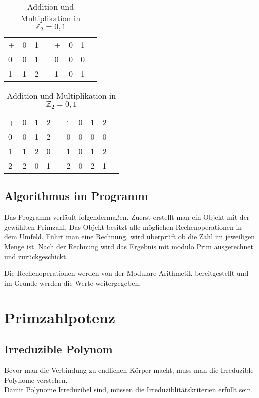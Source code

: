 \begin{table}[h]\caption{Addition und Multiplikation in $ \mathbb{Z}_2 = {0,1} $}
    \begin{tabular}{l|l|lll|l|ll}
    + & 0 & 1 &  & + & 0 & 1 &  \\ \cline{1-3} \cline{5-7}
    0 & 0 & 1 &  & 0 & 0 & 0 &  \\ \cline{1-3} \cline{5-7}
    1 & 1 & 2 &  & 1 & 0 & 1 & 
    \end{tabular}
\end{table}
\begin{table}[h]\caption{Addition und Multiplikation in $ \mathbb{Z}_2 = {0,1} $}
    \begin{tabular}{l|l|l|lll|l|l|ll}
    + & 0 & 1 & 2 &  & $\cdot$ & 0 & 1 & 2 &  \\ \cline{1-4} \cline{6-9}
    0 & 0 & 1 & 2 &  & 0 & 0 & 0 & 0 &  \\ \cline{1-4} \cline{6-9}
    1 & 1 & 2 & 0 &  & 1 & 0 & 1 & 2 &  \\ \cline{1-4} \cline{6-9}
    2 & 2 & 0 & 1 &  & 2 & 0 & 2 & 1 & 
    \end{tabular}
\end{table}

\subsection*{Algorithmus im Programm}

Das Programm verläuft folgendermaßen. Zuerst erstellt man ein Objekt mit der gewählten Primzahl. Das Objekt besitzt alle möglichen Rechenoperationen in dem Umfeld.
Führt man eine Rechnung, wird überprüft ob die Zahl im jeweiligen Menge ist. Nach der Rechnung wird das Ergebnis mit modulo Prim ausgerechnet und zurückgeschickt. 

Die Rechenoperationen werden von der Modulare Arithmetik bereitgestellt und im Grunde werden die Werte weitergegeben.

\newpage
\section{Primzahlpotenz}

\subsection*{Irreduzible Polynom}


Bevor man die Verbindung zu endlichen Körper macht, muss man die Irreduzible Polynome verstehen.\\
Damit Polynome Irreduzibel sind, müssen die Irreduziblitätskriterien erfüllt sein.\\

